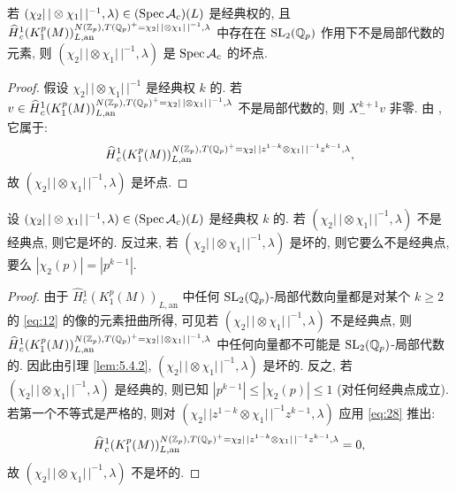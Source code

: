 \begin{lemma}\label{lem:5.4.2}
若 $(\chi_2|\,| \otimes \chi_1|\,|^{-1},\lambda) \in (\operatorname{Spec} \mathcal{A}_c)(L)$ 是经典权的, 且 $\widehat{H}{}_{c}^{1}(K_1^{p}(M))_{L,\mathrm{an}}^{N(\mathbb{Z}_p),T(\mathbb{Q}_p)^{+} = \chi_2|\,| \otimes \chi_1|\,|^{-1},\lambda}$ 中存在在 $\mathrm{SL}_2(\mathbb{Q}_p)$ 作用下不是局部代数的元素, 则 $(\chi_2|\,| \otimes \chi_1|\,|^{-1},\lambda)$ 是 $\operatorname{Spec} \mathcal{A}_c$ 的坏点.
\end{lemma}

\begin{proof}
假设 $\chi_2|\,| \otimes \chi_1|\,|^{-1}$ 是经典权 $k$ 的.
若 $v \in \widehat{H}{}_{c}^{1}(K_1^{p}(M))_{L,\mathrm{an}}^{N(\mathbb{Z}_p),T(\mathbb{Q}_p)^{+} = \chi_2|\,| \otimes \chi_1|\,|^{-1},\lambda}$ 不是局部代数的, 则 $X_{-}^{k+1}v$ 非零.
由 \cite[Prop.~4.4.4]{ref:22}, 它属于:
\[
\widehat{H}{}_{c}^{1}(K_1^{p}(M))_{L,\mathrm{an}}^{N(\mathbb{Z}_p),T(\mathbb{Q}_p)^{+} = \chi_2|\,|z^{1-k} \otimes \chi_1|\,|^{-1}z^{k-1},\lambda},
\]
故 $(\chi_2|\,| \otimes \chi_1|\,|^{-1},\lambda)$ 是坏点.
\end{proof}

\begin{proposition}\label{prop:5.4.3}
设 $(\chi_2|\,| \otimes \chi_1|\,|^{-1},\lambda) \in (\operatorname{Spec} \mathcal{A}_c)(L)$ 是经典权 $k$ 的.
若 $(\chi_2|\,| \otimes \chi_1|\,|^{-1},\lambda)$ 不是经典点, 则它是坏的.
反过来, 若 $(\chi_2|\,| \otimes \chi_1|\,|^{-1},\lambda)$ 是坏的, 则它要么不是经典点, 要么 $|\chi_2(p)| = |p^{k-1}|$.
\end{proposition}

\begin{proof}
由于 $\widehat{H}{}_{c}^{1}(K_1^{p}(M))_{L,\mathrm{an}}$ 中任何 $\mathrm{SL}_2(\mathbb{Q}_p)$-局部代数向量都是对某个 $k \ge 2$ 的 \eqref{eq:12} 的像的元素扭曲所得, 可见若 $(\chi_2|\,| \otimes \chi_1|\,|^{-1},\lambda)$ 不是经典点, 则 $\widehat{H}{}_{c}^{1}(K_1^{p}(M))_{L,\mathrm{an}}^{N(\mathbb{Z}_p),T(\mathbb{Q}_p)^{+} = \chi_2|\,| \otimes \chi_1|\,|^{-1},\lambda}$ 中任何向量都不可能是 $\mathrm{SL}_2(\mathbb{Q}_p)$-局部代数的.
因此由引理 \ref{lem:5.4.2}, $(\chi_2|\,| \otimes \chi_1|\,|^{-1},\lambda)$ 是坏的.
反之, 若 $(\chi_2|\,| \otimes \chi_1|\,|^{-1},\lambda)$ 是经典的, 则已知 $|p^{k-1}| \le |\chi_2(p)| \le 1$ (对任何经典点成立).
若第一个不等式是严格的, 则对 $(\chi_2|\,|z^{1-k} \otimes \chi_1|\,|^{-1}z^{k-1},\lambda)$ 应用 \eqref{eq:28} 推出:
\[
\widehat{H}{}_{c}^{1}(K_1^{p}(M))_{L,\mathrm{an}}^{N(\mathbb{Z}_p),T(\mathbb{Q}_p)^{+} = \chi_2|\,|z^{1-k} \otimes \chi_1|\,|^{-1}z^{k-1},\lambda} = 0,
\]
故 $(\chi_2|\,| \otimes \chi_1|\,|^{-1},\lambda)$ 不是坏的.
\end{proof}

